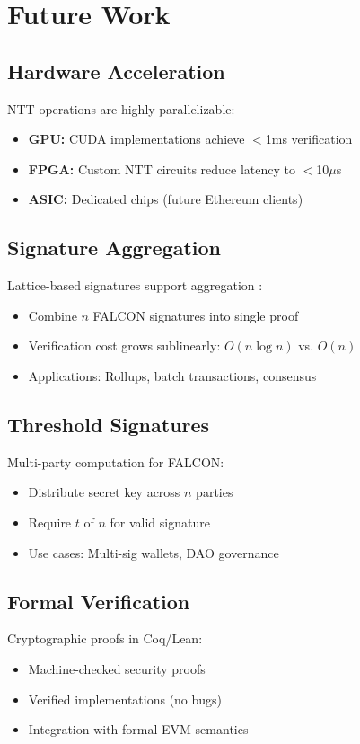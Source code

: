 \section{Future Work}


\subsection{Hardware Acceleration}

NTT operations are highly parallelizable:
\begin{itemize}
    \item \textbf{GPU:} CUDA implementations achieve $<$1ms verification
    \item \textbf{FPGA:} Custom NTT circuits reduce latency to $<$10$\mu$s
    \item \textbf{ASIC:} Dedicated chips (future Ethereum clients)
\end{itemize}

\subsection{Signature Aggregation}

Lattice-based signatures support aggregation \cite{boneh2018compact}:
\begin{itemize}
    \item Combine $n$ FALCON signatures into single proof
    \item Verification cost grows sublinearly: $O(n \log n)$ vs. $O(n)$
    \item Applications: Rollups, batch transactions, consensus
\end{itemize}

\subsection{Threshold Signatures}

Multi-party computation for FALCON:
\begin{itemize}
    \item Distribute secret key across $n$ parties
    \item Require $t$ of $n$ for valid signature
    \item Use cases: Multi-sig wallets, DAO governance
\end{itemize}

\subsection{Formal Verification}

Cryptographic proofs in Coq/Lean:
\begin{itemize}
    \item Machine-checked security proofs
    \item Verified implementations (no bugs)
    \item Integration with formal EVM semantics
\end{itemize}

